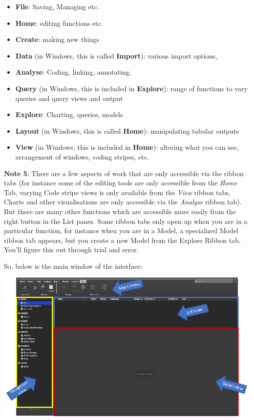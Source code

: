 \documentclass[
]{book}
\providecommand{\tightlist}{%
  \setlength{\itemsep}{0pt}\setlength{\parskip}{0pt}}
\begin{document}
\begin{itemize}
\tightlist
\item
  \textbf{File}: Saving, Managing etc.
\item
  \textbf{Home}: editing functions etc.
\item
  \textbf{Create}: making new things
\item
  \textbf{Data} (in Windows, this is called \textbf{Import}): various import options,
\item
  \textbf{Analyse}: Coding, linking, annotating.
\item
  \textbf{Query} (in Windows, this is included in \textbf{Explore}): range of functions to vary queries and query views and output
\item
  \textbf{Explore}: Charting, queries, models
\item
  \textbf{Layout} (in Windows, this is called \textbf{Home}): manipulating tabular outputs
\item
  \textbf{View} (in Windows, this is included in \textbf{Home}): altering what you can see, arrangement of windows, coding stripes, etc.
\end{itemize}

\textbf{Note 5}: There are a few aspects of work that are only accessible via the ribbon tabs (for instance some of the editing tools are only accessible from the \emph{Home} Tab, varying Code stripe views is only available from the \emph{View} ribbon tabs, Charts and other visualisations are only accessible via the \emph{Analyse} ribbon tab). But there are many other functions which are accessible more easily from the right button in the List panes. Some ribbon tabs only open up when you are in a particular function, for instance when you are in a Model, a specialized Model ribbon tab appears, but you create a new Model from the Explore Ribbon tab. You'll figure this out through trial and error.

So, below is the main window of the interface:

\includegraphics{imgs/interface_mac.png}
\end{document}
